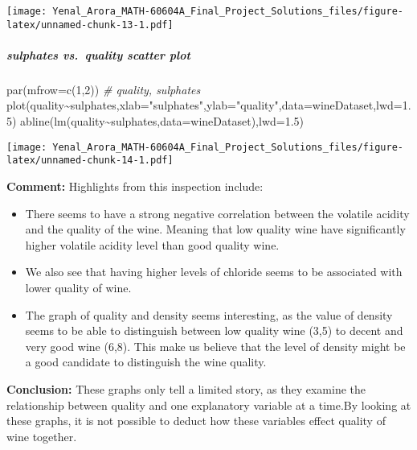 \documentclass[
]{article}
\newenvironment{Shaded}{\begin{snugshade}}{\end{snugshade}}
\newcommand{\AttributeTok}[1]{\textcolor[rgb]{0.77,0.63,0.00}{#1}}
\newcommand{\CommentTok}[1]{\textcolor[rgb]{0.56,0.35,0.01}{\textit{#1}}}
\newcommand{\DecValTok}[1]{\textcolor[rgb]{0.00,0.00,0.81}{#1}}
\newcommand{\FloatTok}[1]{\textcolor[rgb]{0.00,0.00,0.81}{#1}}
\newcommand{\FunctionTok}[1]{\textcolor[rgb]{0.00,0.00,0.00}{#1}}
\newcommand{\NormalTok}[1]{#1}
\newcommand{\SpecialCharTok}[1]{\textcolor[rgb]{0.00,0.00,0.00}{#1}}
\newcommand{\StringTok}[1]{\textcolor[rgb]{0.31,0.60,0.02}{#1}}
\begin{document}
\texttt{[image: Yenal\_Arora\_MATH-60604A\_Final\_Project\_Solutions\_files/figure-latex/unnamed-chunk-13-1.pdf]}

\hypertarget{sulphates-vs.-quality-scatter-plot}{%
\subparagraph{sulphates vs.~quality scatter
plot}\label{sulphates-vs.-quality-scatter-plot}}

\begin{Shaded}
\begin{Highlighting}[]
\FunctionTok{par}\NormalTok{(}\AttributeTok{mfrow=}\FunctionTok{c}\NormalTok{(}\DecValTok{1}\NormalTok{,}\DecValTok{2}\NormalTok{))}
\CommentTok{\# quality, sulphates}
\FunctionTok{plot}\NormalTok{(quality}\SpecialCharTok{\textasciitilde{}}\NormalTok{sulphates,}\AttributeTok{xlab=}\StringTok{"sulphates"}\NormalTok{,}\AttributeTok{ylab=}\StringTok{"quality"}\NormalTok{,}\AttributeTok{data=}\NormalTok{wineDataset,}\AttributeTok{lwd=}\FloatTok{1.5}\NormalTok{)}
\FunctionTok{abline}\NormalTok{(}\FunctionTok{lm}\NormalTok{(quality}\SpecialCharTok{\textasciitilde{}}\NormalTok{sulphates,}\AttributeTok{data=}\NormalTok{wineDataset),}\AttributeTok{lwd=}\FloatTok{1.5}\NormalTok{)}
\end{Highlighting}
\end{Shaded}

\texttt{[image: Yenal\_Arora\_MATH-60604A\_Final\_Project\_Solutions\_files/figure-latex/unnamed-chunk-14-1.pdf]}

\textbf{Comment:} Highlights from this inspection include:

\begin{itemize}
\item
  There seems to have a strong negative correlation between the volatile
  acidity and the quality of the wine. Meaning that low quality wine
  have significantly higher volatile acidity level than good quality
  wine.
\item
  We also see that having higher levels of chloride seems to be
  associated with lower quality of wine.
\item
  The graph of quality and density seems interesting, as the value of
  density seems to be able to distinguish between low quality wine (3,5)
  to decent and very good wine (6,8). This make us believe that the
  level of density might be a good candidate to distinguish the wine
  quality.
\end{itemize}

\textbf{Conclusion:} These graphs only tell a limited story, as they
examine the relationship between quality and one explanatory variable at
a time.By looking at these graphs, it is not possible to deduct how
these variables effect quality of wine together.
\end{document}
